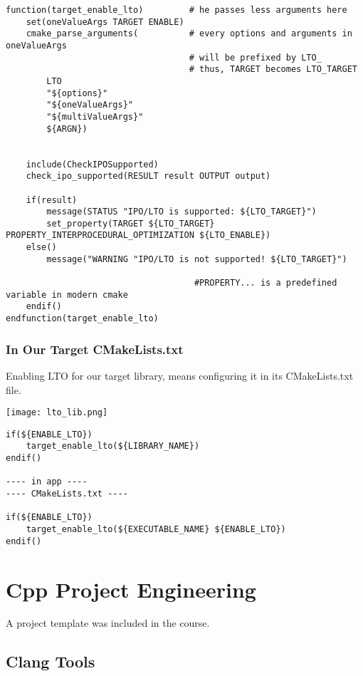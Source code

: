 \begin{verbatim}
function(target_enable_lto)         # he passes less arguments here
    set(oneValueArgs TARGET ENABLE)
    cmake_parse_arguments(          # every options and arguments in oneValueArgs
                                    # will be prefixed by LTO_
                                    # thus, TARGET becomes LTO_TARGET
        LTO
        "${options}"
        "${oneValueArgs}"
        "${multiValueArgs}"
        ${ARGN})


    include(CheckIPOSupported)
    check_ipo_supported(RESULT result OUTPUT output)

    if(result) 
        message(STATUS "IPO/LTO is supported: ${LTO_TARGET}")
        set_property(TARGET ${LTO_TARGET} PROPERTY_INTERPROCEDURAL_OPTIMIZATION ${LTO_ENABLE})
    else()
        message("WARNING "IPO/LTO is not supported! ${LTO_TARGET}")

                                     #PROPERTY... is a predefined variable in modern cmake
    endif()
endfunction(target_enable_lto)
\end{verbatim}

\subsection{In Our Target CMakeLists.txt}

Enabling LTO for our target library, means configuring it in its CMakeLists.txt file.

\begin{center}
    \texttt{[image: lto\_lib.png]}
\end{center}


\begin{verbatim}
if(${ENABLE_LTO})
    target_enable_lto(${LIBRARY_NAME})
endif()

---- in app ----
---- CMakeLists.txt ----

if(${ENABLE_LTO})
    target_enable_lto(${EXECUTABLE_NAME} ${ENABLE_LTO})
endif()
\end{verbatim}

\chapter{Cpp Project Engineering}

A project template was included in the course. 


\section{Clang Tools}

